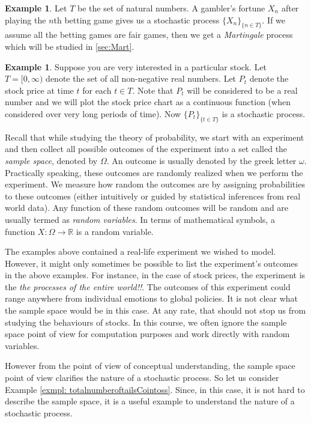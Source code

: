 \documentclass[letterpaper, 12pt]{article}
\newcommand{\1}{\mathds{1}} %
\theoremstyle{definition}
\newtheorem{example}[theorem]{Example}
\begin{document}
\begin{example}
  \label{exmpl:Martingale}
Let $T$ be the set of natural numbers. A gambler's fortune $X_n$ after playing the $n$th betting game gives us a stochastic process $\{X_n\}_{\{n \in T\}}$. If we assume all the betting games are fair games, then we get a \emph{Martingale} process which will be studied in \ref{sec:Mart}. 
\end{example}

\begin{example}
\label{exmpl:StockPrices}
Suppose you are very interested in a particular stock. Let $T=[0,\infty)$ denote the set of all non-negative real numbers. Let $P_t$ denote the stock price at time $t$ for each $t \in T$. Note that $P_t$ will be considered to be a real number and we will plot the stock price chart as a continuous function (when considered over very long periods of time). Now $\{P_t\}_{\{t \in T\}}$ is a stochastic process.
\end{example}

Recall that while studying the theory of probability, we start with an experiment and then collect all possible outcomes of the experiment into a set called the \emph{sample space}, denoted by $\Omega$. An outcome is usually denoted by the greek letter $\omega$. Practically speaking, these outcomes are randomly realized when we perform the experiment. We measure how random the outcomes are by assigning probabilities to these outcomes (either intuitively or guided by statistical inferences from real world data). Any function of these random outcomes will be random and are usually termed as \emph{random variables}. In terms of mathematical symbols, a function $X: \Omega \to \mathbb{R}$ is a random variable. 

The examples above contained a real-life experiment we wished to model. However, it might only sometimes be possible to list the experiment's outcomes in the above examples. For instance, in the case of stock prices, the experiment is the \emph{the processes of the entire world!!}. The outcomes of this experiment could range anywhere from individual emotions to global policies. It is not clear what the sample space would be in this case. At any rate, that should not stop us from studying the behaviours of stocks. In this course, we often ignore the sample space point of view for computation purposes and work directly with random variables. 

However from the point of view of conceptual understanding, the sample space point of view clarifies the nature of a stochastic process. So let us consider Example \ref{exmpl: totalnumberoftailsCointoss}. Since, in this case, it is not hard to describe the sample space, it is a useful example to understand the nature of a stochastic process. 
\end{document}
